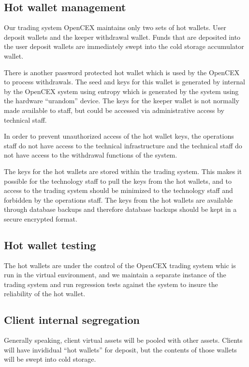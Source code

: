 \subsection{Hot wallet management}
Our trading system OpenCEX maintains only two sets of hot
wallets.  User deposit wallets and the keeper withdrawal wallet.
Funds that are deposited into the user deposit wallets are immediately
swept into the cold storage accumulator wallet.

There is another password protected hot wallet which is used by the
OpenCEX to process withdrawals.  The seed and keys for this wallet is
generated by internal by the OpenCEX system using entropy which is
generated by the system using the hardware ``urandom'' device.  The
keys for the keeper wallet is not normally made available to staff,
but could be accessed via administrative access by technical staff.

In order to prevent unauthorized access of the hot wallet keys, the
operations staff do not have access to the technical infrastructure
and the technical staff do not have access to the withdrawal functions
of the system.

The keys for the hot wallets are stored within the trading system.
This makes it possible for the technology staff to pull the keys from
the hot wallets, and to access to the trading system should be
minimized to the technology staff and forbidden by the operations
staff.  The keys from the hot wallets are available through database
backups and therefore database backups should be kept in a secure
encrypted format.

\subsection{Hot wallet testing}
The hot wallets are under the control of the OpenCEX trading system
whic is run in the virtual environment, and we maintain a separate
instance of the trading system and run regression tests against the
system to insure the reliability of the hot wallet.


\subsection{Client internal segregation}
Generally speaking, client virtual assets will be pooled with other
assets.  Clients will have invididual ``hot wallets'' for deposit, but
the contents of those wallets will be swept into cold storage.

